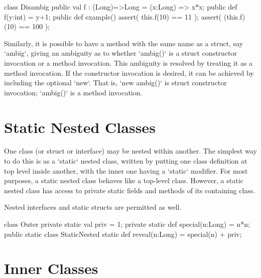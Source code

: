 \begin{ex}

\begin{xten}
class Disambig {
  public val f : (Long)=>Long =  (x:Long) => x*x;
  public def f(y:int) = y+1;
  public def example() {
      assert(  this.f(10)  == 11  );
      assert( (this.f)(10) == 100 );
  }
}
\end{xten}
%

\end{ex}

Similarly, it is possible to have a method with the same name as a struct, say
\xcd`ambig`, giving an ambiguity as to whether \xcd`ambig()` is a struct
constructor invocation or a method invocation.  This ambiguity is resolved by
treating it as a method invocation.  If the constructor invocation is desired,
it can be achieved by including the optional \xcd`new`.  That is, 
\xcd`new ambig()` is struct constructor invocation; \xcd`ambig()` is a 
method invocation.

\section{Static Nested Classes}
\label{StaticNestedClasses}

One class (or struct or interface) may be nested within another.  The simplest
way to do this is as a \xcd`static` nested class, written by putting one class
definition at top level inside another, with the inner one having a
\xcd`static` modifier.  
For most purposes, a static nested class behaves like a top-level class.
However, a static nested class has access to private static
fields and methods of its containing class.  

Nested interfaces and static structs are permitted as well.

\begin{xten}
class Outer {
  private static val priv = 1;
  private static def special(n:Long) = n*n;
  public static class StaticNested {
     static def reveal(n:Long) = special(n) + priv;
  }
}
\end{xten}
%

\section{Inner Classes}
\label{InnerClasses}



